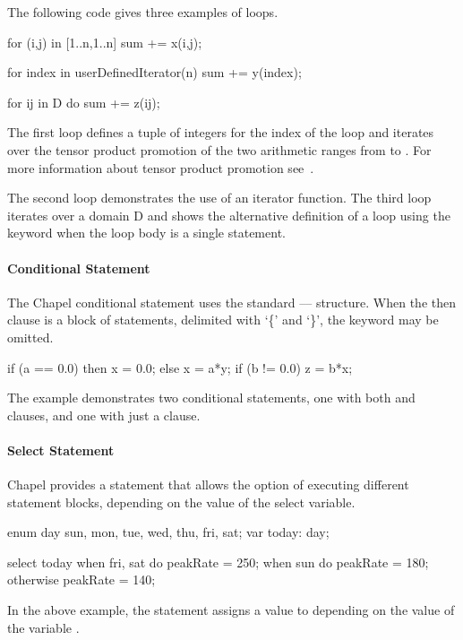 \begin{example}
The following code gives three examples of  loops. 
\begin{chapel}
for (i,j) in [1..n,1..n] {
  sum += x(i,j);
}

for index in userDefinedIterator(n) {
  sum += y(index);
}

for ij in D do sum += z(ij);
\end{chapel}
The first  loop defines a tuple of integers for the
index of the loop and iterates over the tensor product promotion
of the two arithmetic ranges from  to .  For
more information about tensor product promotion 
see~.   

The second  loop demonstrates the use of 
an iterator function.  The third  loop iterates over a
domain D and shows the alternative definition of a  loop
using the  keyword when the loop body is a single statement.
\end{example}

\paragraph{Conditional Statement} 
The Chapel conditional statement uses the standard
---- structure.  When
the then clause is a block of statements, delimited with
`\{' and `\}', the  keyword may be omitted.

\begin{example}
\begin{chapel}
if (a == 0.0) then 
  x = 0.0;
else 
  x = a*y;
if (b != 0.0) {
  z = b*x;
}
\end{chapel}
The example demonstrates two conditional statements, one with
both  and  clauses, and one with just a
 clause.
\end{example}

\paragraph{Select Statement} 
Chapel provides a  statement that allows the option of
executing different statement blocks, depending on the value of the
select variable.

\begin{example}
\begin{chapel}
enum day {sun, mon, tue, wed, thu, fri, sat};
var today: day;

select today {
  when fri, sat do peakRate = 250;
  when sun do peakRate = 180;
  otherwise peakRate = 140;
}
\end{chapel}
In the above example, the  statement assigns
a value to  depending on the value of the 
variable .
\end{example}

